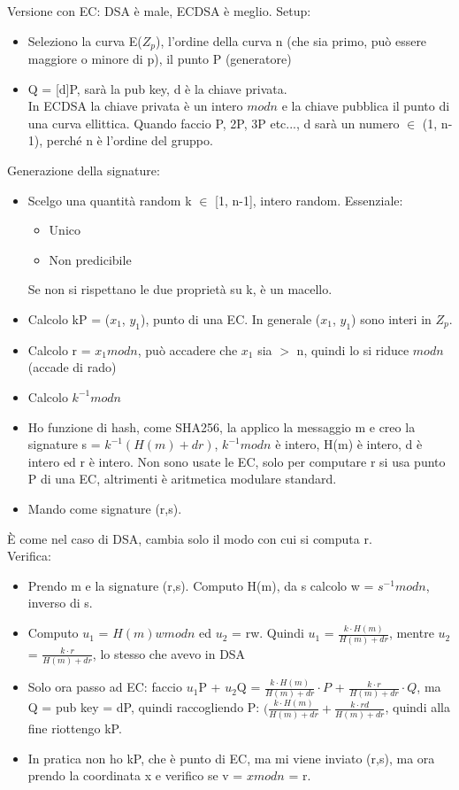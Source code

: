 \documentclass[16px]{article}
\begin{document}
Versione con EC: DSA è male, ECDSA è meglio. Setup:
\begin{itemize}
\item Seleziono la curva E($Z_p$), l'ordine della curva n (che sia primo, può essere maggiore o minore di p), il punto P (generatore)
\item Q = [d]P, sarà la pub key, d è la chiave privata.\\ In ECDSA la chiave privata è un intero $modn$ e la chiave pubblica il punto di una curva ellittica. Quando faccio P, 2P, 3P etc..., d sarà un numero $\in$ (1, n-1), perché n è l'ordine del gruppo.
\end{itemize}
Generazione della signature:
\begin{itemize}
\item Scelgo una quantità random k $\in$ [1, n-1], intero random. Essenziale:
\begin{itemize}
\item Unico
\item Non predicibile
\end{itemize}
Se non si rispettano le due proprietà su k, è un macello.
\item Calcolo kP = ($x_1$, $y_1$), punto di una EC. In generale ($x_1$, $y_1$) sono interi in $Z_p$.
\item Calcolo r = $x_1modn$, può accadere che $x_1$ sia $>$ n, quindi lo si riduce $modn$ (accade di rado)
\item Calcolo $k^{-1}modn$
\item Ho funzione di hash, come SHA256, la applico la messaggio m e creo la signature s = $k^{-1}(H(m) +dr)$, $k^{-1}modn$ è intero, H(m) è intero, d è intero ed r è intero. Non sono usate le EC, solo per computare r si usa punto P di una EC, altrimenti è aritmetica modulare standard.
\item Mando come signature (r,s).
\end{itemize} 
È come nel caso di DSA, cambia solo il modo con cui si computa r.\\ Verifica:
\begin{itemize}
\item Prendo m e la signature (r,s). Computo H(m), da s calcolo w = $s^{-1}modn$, inverso di s.
\item Computo $u_1$ = $H(m)wmodn$ ed $u_2$ = rw. Quindi $u_1$ = $\frac{k\cdot H(m)}{H(m) +dr}$, mentre $u_2$ = $\frac{k\cdot r}{H(m) +dr}$, lo stesso che avevo in DSA
\item Solo ora passo ad EC: faccio $u_1$P + $u_2$Q = $\frac{k\cdot H(m)}{H(m) +dr}\cdot P$ + $\frac{k\cdot r}{H(m) +dr}\cdot Q$, ma Q = pub key = dP, quindi raccogliendo P: $(\frac{k\cdot H(m)}{H(m) +dr} + \frac{k\cdot rd}{H(m) +dr}$, quindi alla fine riottengo kP.
\item In pratica non ho kP, che è punto di EC, ma mi viene inviato (r,s), ma ora prendo la coordinata x e verifico se v = $xmodn$ = r.
\end{itemize}
\end{document}
